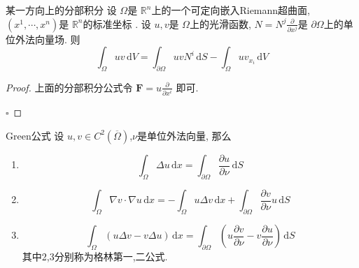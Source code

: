 \documentclass[../../main.tex]{subfiles}
\begin{document}
\begin{corollary}{某一方向上的分部积分}
      设 \(   \Omega   \)是 \(  \mathbb{R} ^{n}  \)上的一个可定向嵌入Riemann超曲面, \(  \left(  x^1,\cdots,x^n  \right)   \)是 \(  \mathbb{R} ^{n}  \)的标准坐标  . 设 \(  u,v  \)是 \(   \Omega   \)上的光滑函数, \(  N= N^{j}\frac{\partial }{\partial x^{j}} \)是 \(   \partial  \Omega   \)上的单位外法向量场.    则  \[
      \int_{ \Omega } uv\,\mathrm{d} V=  \int_{ \partial  \Omega } uvN^{i}\,\mathrm{d} S- \int_{ \Omega } uv_{x_{i}}\,\mathrm{d} V
      \]
\end{corollary}
\begin{proof}
    上面的分部积分公式令 \(  \mathbf{F}= u \frac{\partial }{\partial x^{i}}  \) 即可.

    \hfill $\square$
\end{proof}

\begin{theorem}{Green公式}
    设 \(  u,v \in C^{2}\left( \overline{ \Omega } \right)   \),\(  \nu   \)是单位外法向量, 那么 
    \begin{enumerate}
        \item \[
        \int_{ \Omega } \Delta u\,\mathrm{d}x= \int_{ \partial  \Omega }\frac{\partial u}{\partial \nu }\,\mathrm{d} S
        \]\item  \[
        \int_{ \Omega }  \nabla v \cdot  \nabla u\,\mathrm{d} x= - \int_{ \Omega }u \Delta v\,\mathrm{d} x+  \int_{ \partial  \Omega }\frac{\partial v}{\partial \nu } u\,\mathrm{d} S  
        \]
        \item \[
        \int_{ \Omega }\left( u \Delta v-v  \Delta u \right)\,\mathrm{d} x= \int_{ \partial  \Omega }\left( u\frac{\partial v}{\partial \nu }-v \frac{\partial u}{\partial \nu } \right)\,\mathrm{d} S  
        \]其中2,3分别称为格林第一,二公式.
    \end{enumerate}
    
\end{theorem}
\end{document}

